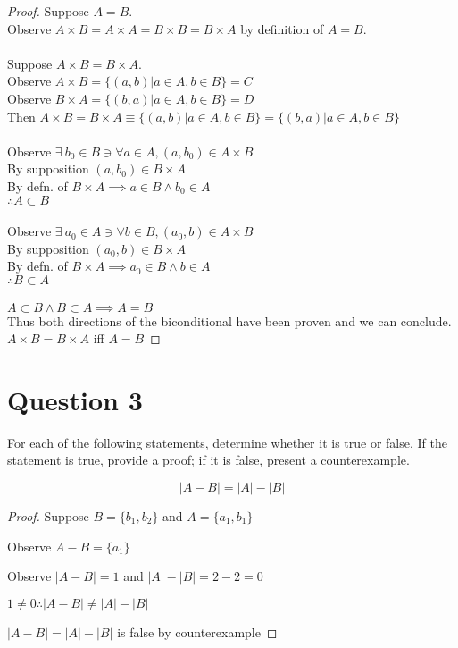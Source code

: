 \documentclass[11pt]{article}
\theoremstyle{plain}
\begin{document}
\begin{proof}
    Suppose $A = B$. \\
    Observe $A \times B = A \times A = B \times B = B \times A$ by definition of $A = B$. \\ \\
    Suppose $A \times B = B \times A$.\\
    Observe $A \times B = \{(a,b) | a\in A, b \in B\} = C$\\
    Observe $B \times A = \{(b,a) | a\in A, b \in B\} = D$\\
    Then $A \times B = B \times A \equiv \{(a,b) | a\in A, b \in B\} =\{(b,a) | a\in A, b \in B\}$\\ \\
    Observe $\exists ~b_0 \in B \ni \forall a \in A, (a,b_0) \in A \times B$ \\
    By supposition $(a,b_0) \in B \times A$\\
    By defn. of $B \times A \implies a \in B \land b_0 \in A$ \\
    $\therefore A \subset B$\\ \\
    Observe $\exists ~a_0 \in A \ni \forall b \in B, (a_0,b) \in A \times B$ \\
    By supposition $(a_0,b) \in B \times A$\\
    By defn. of $B \times A \implies a_0 \in B \land b \in A$ \\
    $\therefore B \subset A$\\ \\
    $A \subset B \land B \subset A \implies A=B$\\
    Thus both directions of the biconditional have been proven and we can conclude. $A \times B = B \times A$ iff $A=B$
\end{proof}

\section{Question 3}
For each of the following statements, determine whether it is true or false. If the statement is true, provide a proof; if it is false, present a counterexample.

$$|A-B| = |A| - |B|$$
\begin{proof}
    \item Suppose $B = \{b_1, b_2\}$ and $A = \{a_1, b_1\}$
    \item Observe $A-B = \{a_1\}$
    \item Observe $|A-B| = 1$ and $|A| - |B| = 2 - 2 = 0$
    \item $1 \neq 0 \therefore |A-B| \neq |A| - |B|$
    \item $|A-B| = |A| - |B|$ is false by counterexample
\end{proof}
\end{document}
